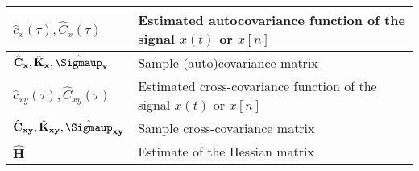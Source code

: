 \documentclass{article}
\begin{document}
\begin{xltabular}{\textwidth}{XX}
    \(\hat{c}_x(\tau), \hat{C}_x(\tau)\)                                                                            & Estimated autocovariance function of the signal \(x(t)\) or \(x[n]\)\\ \hline
    \(\hat{\mathbf{C}}_\mathbf{x}, \hat{\mathbf{K}}_\mathbf{x}, \hat{\boldsymbol{\Sigmaup}}_\mathbf{x}\)            & Sample (auto)covariance matrix \\ \hline
    \(\hat{c}_{xy}(\tau), \hat{C}_{xy}(\tau)\)                                                                      & Estimated cross-covariance function of the signal \(x(t)\) or \(x[n]\)\\ \hline
    \(\hat{\mathbf{C}}_{\mathbf{xy}}, \hat{\mathbf{K}}_{\mathbf{xy}}, \hat{\boldsymbol{\Sigmaup}}_{\mathbf{xy}}\)   & Sample cross-covariance matrix \\ \hline
    \(\hat{\mathbf{H}}\)                                                                                            & Estimate of the Hessian matrix
\end{xltabular}
\end{document}
